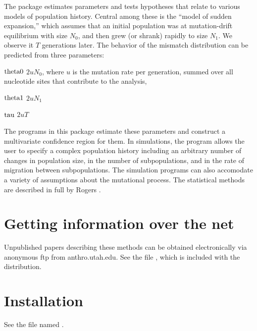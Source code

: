 The package estimates parameters and tests hypotheses that relate to
various models of population history.  Central among these is the
``model of sudden expansion,'' which assumes that an initial population
was at mutation-drift equilibrium with size $N_0$, and then grew (or
shrank) rapidly to size $N_1$.  We observe it $T$ generations later.  The
behavior of the mismatch distribution can be predicted from three
parameters:
\begin{definition}
\item[$\hbox{theta0}$]$2 u N_0$, where $u$ is the mutation rate per
      generation, summed over all nucleotide sites that contribute to
      the analysis, 
\item[$\hbox{theta1}$]$2 u N_1$
\item[$\hbox{tau}$]$2 u T$
\end{definition}
The programs in this package estimate these parameters and construct a
multivariate confidence region for them.  In simulations, the program
allows the user to specify a complex population history including an
arbitrary number of changes in population size, in the number of
subpopulations, and in the rate of migration between subpopulations.
The simulation programs can also accomodate a variety of assumptions
about the mutational process.  The statistical methods are described
in full by Rogers
\cite{Rogers:E-49-608,Rogers:MBE-13-895,Rogers:PPG-97-55}.   

\section{Getting information over the net}

Unpublished papers describing these methods can be obtained
electronically via anonymous ftp from anthro.utah.edu.  See the file
, which is included with the distribution.

\section{Installation}

See the file named .

